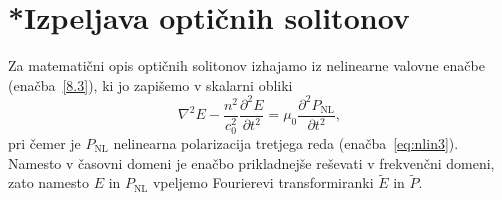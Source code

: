 \section{*Izpeljava optičnih solitonov}
Za matematični opis optičnih solitonov izhajamo iz nelinearne 
valovne enačbe (enačba~\ref{8.3}), ki jo zapišemo v skalarni obliki
\begin{equation}
\nabla^{2}E-\frac{n^2}{c_0^{2}}{\frac{\partial^2 E}{\partial t^2}}=
\mu_{0}{\frac{\partial^2P_{\textrm{NL}}}{\partial t^2}},
\end{equation}
pri čemer je 
$P_\textrm{NL}$ nelinearna polarizacija tretjega reda (enačba~\ref{eq:nlin3}).
Namesto v časovni domeni je enačbo prikladnejše reševati v frekvenčni domeni, zato
namesto $E$ in $P_{\mathrm{NL}}$ vpeljemo Fourierevi transformiranki $\tilde{E}$ in $\tilde{P}$.

